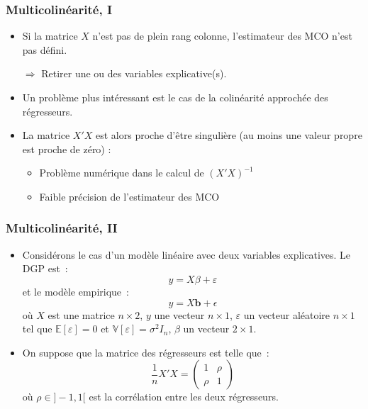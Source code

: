 \documentclass[10pt]{beamer}
\theoremstyle{plain}
\begin{document}
\begin{frame}
  \frametitle{Multicolinéarité, I}

  \begin{itemize}

  \item Si la matrice $X$ n'est pas de plein rang colonne, l'estimateur des MCO n'est pas défini.\newline

  \item[$\Rightarrow$] Retirer une ou des variables explicative(s).\newline

  \item Un problème plus intéressant est le cas de la colinéarité approchée des régresseurs.\newline

  \item La matrice $X'X$ est alors proche d'être singulière (au moins une valeur propre est proche de zéro) :\newline

    \begin{itemize}
    \item Problème numérique dans le calcul de $(X'X)^{-1}$\newline
    \item Faible précision de l'estimateur des MCO\newline
    \end{itemize}

  \end{itemize}

\end{frame}


\begin{frame}
  \frametitle{Multicolinéarité, II}

  \begin{itemize}

  \item Considérons le cas d'un modèle linéaire avec deux variables explicatives. Le DGP est~:
    \[
      y = X\beta + \varepsilon
    \]
    et le modèle empirique~:
    \[
      y = X \mathbf{b} + \epsilon
    \]
    où $X$ est une matrice $n\times 2$, $y$ une
    vecteur $n\times 1$, $\varepsilon$ un vecteur
    aléatoire $n\times 1$ tel que $\mathbb E[\varepsilon] = 0$
    et $\mathbb V[\varepsilon] = \sigma^2I_n$, $\beta$ un
    vecteur $2\times 1$.\newline

  \item On suppose que la matrice des régresseurs est telle que~:
    \[
      \frac{1}{n} X'X =
      \begin{pmatrix}
        1 & \rho \\
        \rho & 1
      \end{pmatrix}
    \]
    où $\rho\in]-1,1[$ est la corrélation entre les deux régresseurs.\newline

    \end{itemize}

  \end{frame}
\end{document}

